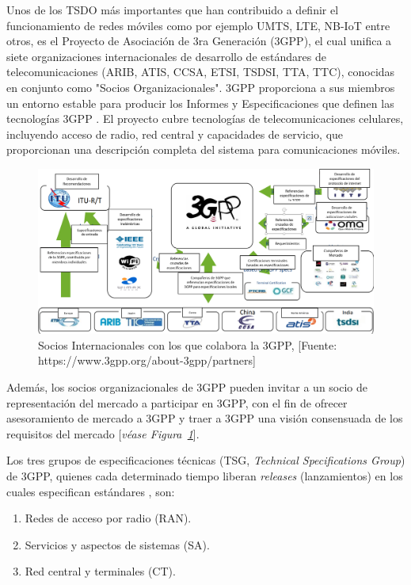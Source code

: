 Unos de los TSDO más importantes que han contribuido a definir el funcionamiento de redes móviles como por ejemplo UMTS, LTE, NB-IoT entre otros, es el Proyecto de Asociación de 3ra Generación (3GPP), el cual unifica a siete organizaciones internacionales de desarrollo de estándares de telecomunicaciones (ARIB, ATIS, CCSA, ETSI, TSDSI, TTA, TTC), conocidas en conjunto como "Socios Organizacionales". 3GPP proporciona a sus miembros un entorno estable para producir los Informes y Especificaciones que definen las tecnologías 3GPP \parencite{3GPP2019}. El proyecto cubre tecnologías de telecomunicaciones celulares, incluyendo acceso de radio, red central y capacidades de servicio, que proporcionan una descripción completa del sistema para comunicaciones móviles. \newline


\begin{figure}[th]
\centering
\includegraphics[scale=.5]{Figures/Socios Internacionales con los que colabora la 3GPP}
\decoRule
\caption[Socios Internacionales con los que colabora la 3GPP]{Socios Internacionales con los que colabora la 3GPP, [Fuente: https://www.3gpp.org/about-3gpp/partners]}
\label{fig:socios}
\end{figure}

Además, los socios organizacionales de 3GPP pueden invitar a un socio de representación del mercado a participar en 3GPP, con el fin de ofrecer asesoramiento de mercado a 3GPP y traer a 3GPP una visión consensuada de los requisitos del mercado [\textit{véase Figura~\ref{fig:socios}}].\newline

Los tres grupos de especificaciones técnicas (TSG, \textit{Technical Specifications Group}) de 3GPP,  quienes cada determinado tiempo liberan \textit{releases} (lanzamientos) en los cuales especifican estándares \parencite{3GPP2019}, son:

\begin{enumerate}
\item  Redes de acceso por radio (RAN).
\item  Servicios y aspectos de sistemas (SA).
\item  Red central y terminales (CT).
\end{enumerate}